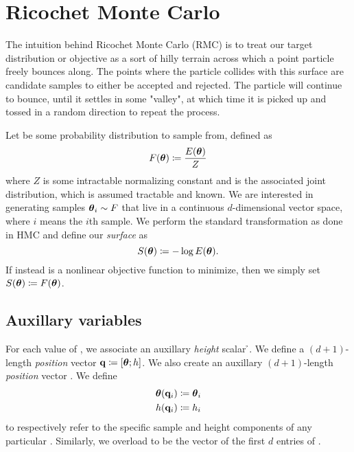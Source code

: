 \section{Ricochet Monte Carlo} \label{s:rmc}

The intuition behind Ricochet Monte Carlo (RMC) is to treat our target
distribution or objective as a sort of hilly terrain across which a point
particle freely bounces along. The points where the particle collides with this
surface are candidate samples to either be accepted and rejected. The particle
will continue to bounce, until it settles in some "valley", at which time it is
picked up and tossed in a random direction to repeat the process.

Let \target{} be some probability distribution to sample from, defined as
\begin{equation*}
    F(\boldsymbol{\theta}){} \coloneqq \frac{E(\boldsymbol{\theta}){}}{Z}
\end{equation*}
where $Z$ is some intractable normalizing constant and \energy{} is the
associated joint distribution, which is assumed tractable and known. We are
interested in generating samples $\boldsymbol{\theta}_i{} \sim F$ that live in a continuous
$d$-dimensional vector space, where $i$ means the $i$th sample. We perform the
standard transformation as done in HMC and define our \emph{surface} as
\begin{equation*}
    \label{eq:surface}
    S(\boldsymbol{\theta}){} \coloneqq - \log E(\boldsymbol{\theta}){}.
\end{equation*}
If instead \target{} is a nonlinear objective function to minimize, then we
simply set $S(\boldsymbol{\theta}){} \coloneqq F(\boldsymbol{\theta}){}$.

\subsection{Auxillary variables} \label{ss:auxillary}

For each value of \thetab{}, we associate an auxillary \emph{height} scalar
\h{}. We define a $(d+1)$-length \emph{position} vector $\mathbf{q}{} \coloneqq
[\boldsymbol{\theta}{}; h{}]$. We also create an auxillary $(d+1)$-length \emph{position}
vector \p{}. We define
\begin{align*}
    \boldsymbol{\theta}(\mathbf{q}_i{}) &\coloneqq  \boldsymbol{\theta}_i{} \\
    h(\mathbf{q}_i{})     &\coloneqq  h_i{}
\end{align*}
to respectively refer to the specific sample and height components of any
particular \qi{}. Similarly, we overload \thetaof{\pi{}} to be the vector of
the first $d$ entries of \pi{}.

